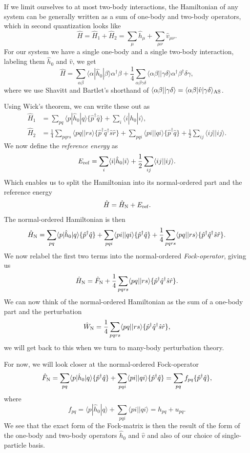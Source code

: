 \documentclass[a4paper, 11pt, notitlepage, english]{article}
\newcommand{\brakket}[2]{\langle #1 || #2 \rangle}
\newcommand{\op}[1]{\hat{#1}}
\newcommand{\braopket}[3]{\langle #1 | {#2} | #3 \rangle}
\begin{document}
If we limit ourselves to at most two-body interactions, the Hamiltonian of any system can be generally written as a sum of one-body and two-body operators, which in second quantization looks like
$$\op{H} = \op{H}_1 + \op{H}_2 = \sum_\mu \op{h}_\mu + \sum_{\mu\nu} \op{v}_{\mu\nu}.$$
For our system we have a single one-body and a single two-body interaction, labeling them $\op{h}_0$ and $\op{v}$, we get
$$\op{H} = \sum_{\alpha\beta} \braopket{\alpha}{\op{h}_0}{\beta}\alpha^\dagger \beta + \frac{1}{4}\sum_{\alpha\beta\gamma\delta}\brakket{\alpha\beta}{\gamma\delta}\alpha^\dagger \beta^\dagger \delta \gamma,$$
where we use Shavitt and Bartlet's shorthand of $\brakket{\alpha\beta}{\gamma\delta} = \braopket{\alpha\beta}{\op{v}}{\gamma\delta}_{\rm AS}$.

Using Wick's theorem, we can write these out as 
\begin{align*}
\op{H}_1 &= \sum_{pq}\braopket{p}{\op{h}_0}{q}\{\op{p}^\dag \op{q}\} + \sum_{i}\braopket{i}{\op{h}_0}{i}, \\
\op{H}_2 &= \frac{1}{4}\sum_{pqrs} \brakket{pq}{rs} \{\op{p}^\dag \op{q}^\dag \op{s}\op{r}\} + \sum_{pqi} \brakket{pi}{qi} \{ \op{p}^\dag \op{q} \} + \frac{1}{2}\sum_{ij} \brakket{ij}{ij}.
\end{align*}
We now define the \emph{reference energy} as
$$E_{\rm ref} = \sum_{i}\braopket{i}{\op{h}_0}{i} + \frac{1}{2}\sum_{ij} \brakket{ij}{ij}.$$
Which enables us to split the Hamiltonian into its normal-ordered part and the reference energy
$$\op{H} = \op{H}_{\rm N} + E_{\rm ref}.$$
The normal-ordered Hamiltonian is then
$$\op{H}_{\rm N} = \sum_{pq}\braopket{p}{\op{h}_0}{q}\{\op{p}^\dag \op{q}\}  + \sum_{pqi} \brakket{pi}{qi}\{\op{p}^\dag \op{q}\}  + \frac{1}{4}\sum_{pqrs} \brakket{pq}{rs} \{\op{p}^\dag \op{q}^\dag \op{s}\op{r}\}.$$
We now relabel the first two terms into the normal-ordered \emph{Fock-operator}, giving us
$$\op{H}_{\rm N} = \op{F}_{\rm N} + \frac{1}{4}\sum_{pqrs} \brakket{pq}{rs} \{\op{p}^\dag \op{q}^\dag \op{s}\op{r}\}.$$
We can now think of the normal-ordered Hamiltonian as the sum of a one-body part and the perturbation
$$\op{W}_{\rm N}  =\frac{1}{4}\sum_{pqrs} \brakket{pq}{rs} \{\op{p}^\dag \op{q}^\dag \op{s}\op{r}\},$$
we will get back to this when we turn to many-body perturbation theory.

\clearpage

For now, we will look closer at the normal-ordered Fock-operator
$$\op{F}_{\rm N} = \sum_{pq}\braopket{p}{\op{h}_0}{q}\{\op{p}^\dag \op{q}\}  + \sum_{pqi} \brakket{pi}{qi} \{\op{p}^\dag \op{q}\} = \sum_{pq} f_{pq} \{\op{p}^\dagger \op{q} \},$$
where
$$f_{pq} = \braopket{p}{\op{h}_0}{q} + \sum_{pqi} \brakket{pi}{qi}  = h_{pq} + u_{pq}.$$
We see that the exact form of the Fock-matrix is then the result of the form of the one-body and two-body operators $\op{h}_0$ and $\op{v}$ and also of our choice of single-particle basis. 
\end{document}
